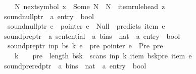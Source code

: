 \begin{isabellebody}
\ \ \ \ {\isacharparenleft}{\kern0pt}{\isasymexists}N{\isachardot}{\kern0pt}\ next{\isacharunderscore}{\kern0pt}symbol\ x\ {\isacharequal}{\kern0pt}\ Some\ N\ {\isasymand}\ N\ {\isacharequal}{\kern0pt}\ item{\isacharunderscore}{\kern0pt}rule{\isacharunderscore}{\kern0pt}head\ z{\isacharparenright}{\kern0pt}{\isachardoublequoteclose}\isanewline
\isanewline
{}\isamarkupfalse%
\ sound{\isacharunderscore}{\kern0pt}null{\isacharunderscore}{\kern0pt}ptr\ {\isacharcolon}{\kern0pt}{\isacharcolon}{\kern0pt}\ {\isachardoublequoteopen}{\isacharprime}{\kern0pt}a\ entry\ {\isasymRightarrow}\ bool{\isachardoublequoteclose}\ \isanewline
\ \ {\isachardoublequoteopen}sound{\isacharunderscore}{\kern0pt}null{\isacharunderscore}{\kern0pt}ptr\ e\ {\isasymequiv}\ pointer\ e\ {\isacharequal}{\kern0pt}\ Null\ {\isasymlongrightarrow}\ predicts\ {\isacharparenleft}{\kern0pt}item\ e{\isacharparenright}{\kern0pt}{\isachardoublequoteclose}\isanewline
\isanewline
{}\isamarkupfalse%
\ sound{\isacharunderscore}{\kern0pt}pre{\isacharunderscore}{\kern0pt}ptr\ {\isacharcolon}{\kern0pt}{\isacharcolon}{\kern0pt}\ {\isachardoublequoteopen}{\isacharprime}{\kern0pt}a\ sentential\ {\isasymRightarrow}\ {\isacharprime}{\kern0pt}a\ bins\ {\isasymRightarrow}\ nat\ {\isasymRightarrow}\ {\isacharprime}{\kern0pt}a\ entry\ {\isasymRightarrow}\ bool{\isachardoublequoteclose}\ \isanewline
\ \ {\isachardoublequoteopen}sound{\isacharunderscore}{\kern0pt}pre{\isacharunderscore}{\kern0pt}ptr\ inp\ bs\ k\ e\ {\isasymequiv}\ {\isasymforall}pre{\isachardot}{\kern0pt}\ pointer\ e\ {\isacharequal}{\kern0pt}\ Pre\ pre\ {\isasymlongrightarrow}\isanewline
\ \ \ \ k\ {\isachargreater}{\kern0pt}\ {}\ {\isasymand}\ pre\ {\isacharless}{\kern0pt}\ length\ {\isacharparenleft}{\kern0pt}bs{\isacharbang}{\kern0pt}{\isacharparenleft}{\kern0pt}k{\isacharminus}{\kern0pt}{}{\isacharparenright}{\kern0pt}{\isacharparenright}{\kern0pt}\ {\isasymand}\ scans\ inp\ k\ {\isacharparenleft}{\kern0pt}item\ {\isacharparenleft}{\kern0pt}bs{\isacharbang}{\kern0pt}{\isacharparenleft}{\kern0pt}k{\isacharminus}{\kern0pt}{}{\isacharparenright}{\kern0pt}{\isacharbang}{\kern0pt}pre{\isacharparenright}{\kern0pt}{\isacharparenright}{\kern0pt}\ {\isacharparenleft}{\kern0pt}item\ e{\isacharparenright}{\kern0pt}{\isachardoublequoteclose}\isanewline
\isanewline
{}\isamarkupfalse%
\ sound{\isacharunderscore}{\kern0pt}prered{\isacharunderscore}{\kern0pt}ptr\ {\isacharcolon}{\kern0pt}{\isacharcolon}{\kern0pt}\ {\isachardoublequoteopen}{\isacharprime}{\kern0pt}a\ bins\ {\isasymRightarrow}\ nat\ {\isasymRightarrow}\ {\isacharprime}{\kern0pt}a\ entry\ {\isasymRightarrow}\ bool{\isachardoublequoteclose}\ \isanewline

\end{isabellebody}
